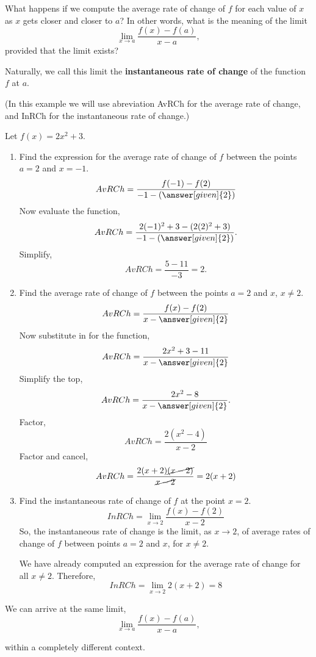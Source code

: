 \documentclass{ximera}
\begin{document}
What happens if we compute the average rate of change of $f$  for each value of $x$ as $x$ gets closer and closer to $a$? In other words, what is the meaning of the limit
\[
     \lim_{x\to a} \frac{f(x)-f(a)}{x-a},
    \] 
    provided that the limit exists?
    
Naturally, we call this limit the \textbf{instantaneous rate of change} of the function $f$ at $a$.
\begin{example}
(In this example we will use abreviation AvRCh for the average rate of change,  and InRCh for the instantaneous rate of change.)

Let $f(x)=2x^2+3$.
\begin{enumerate}
\item Find the expression for the average rate of change of $f$ between the points  $a=2$ and $x=-1$.
\[
AvRCh=\frac{f(-1)-f(2)}{-1-\left(\answer[given]{2}\right)}
\]
  Now evaluate the function,
  \[
AvRCh=\frac{2(-1)^2+3-(2(2)^2+3)}{-1-\left(\answer[given]{2}\right)}.
\]
Simplify,
 \[
AvRCh=\frac{5-11}{-3}=2.
\]
\item Find  the average rate of change of $f$ between the points $a=2$ and $x$, $x\ne 2$.
\[
AvRCh=\frac{f(x)-f(2)}{x-\answer[given]{2}}
\]
 Now substitute in for the function,
\[
AvRCh=\frac{2x^2+3-11}{x-\answer[given]{2}}
\]
Simplify the top,
\[
AvRCh=\frac{2x^2-8}{x-\answer[given]{2}}.
\]
Factor,
\[
AvRCh=\frac{2(x^2-4)}{x-2}
\]
Factor and cancel,
\[
AvRCh=\frac{2(x+2)\cancel{(x-2)}}{\cancel{x-2}}=2(x+2)
\]
\item Find the instantaneous rate of change of $f$ at the point $x=2$.
\[
InRCh= \lim_{x\to 2} \frac{f(x)-f(2)}{x-2}
\]
So, the instantaneous rate of change is the limit, as $x\to 2$, of average rates of change of $f$ between points $a=2$ and $x$, for $x\ne2$. 

We have already computed an expression for the average rate of change for all $x\ne2$. 
Therefore,
\[
InRCh=\lim_{x\to 2}2(x+2)=8
\]

\end{enumerate}
\end{example}
We can arrive at the same limit,
\[
     \lim_{x\to a} \frac{f(x)-f(a)}{x-a},
    \] 

 within a completely different context.
\end{document}
